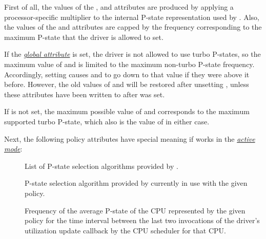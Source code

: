 \documentclass[a4paper,8pt,english]{sphinxmanual}
\begin{document}
First of all, the values of the ,  and
 attributes are produced by applying a processor-specific
multiplier to the internal P-state representation used by .
Also, the values of the  and 
attributes are capped by the frequency corresponding to the maximum P-state that
the driver is allowed to set.

If the  {\hyperref[admin\string-guide/pm/intel_pstate:no\string-turbo\string-attr]{\emph{global attribute}}}\label{admin-guide/pm/intel_pstate:no-turbo-attr} is set, the driver is
not allowed to use turbo P-states, so the maximum value of 
and  is limited to the maximum non-turbo P-state frequency.
Accordingly, setting  causes  and
 to go down to that value if they were above it before.
However, the old values of  and  will be
restored after unsetting , unless these attributes have been written
to after  was set.

If  is not set, the maximum possible value of 
and  corresponds to the maximum supported turbo P-state,
which also is the value of  in either case.

Next, the following policy attributes have special meaning if
 works in the {\hyperref[admin\string-guide/pm/intel_pstate:active\string-mode]{\emph{active mode}}}\label{admin-guide/pm/intel_pstate:active-mode}:
\begin{description}
\item[{}] \leavevmode
List of P-state selection algorithms provided by .

\item[{}] \leavevmode
P-state selection algorithm provided by  currently in
use with the given policy.

\item[{}] \leavevmode
Frequency of the average P-state of the CPU represented by the given
policy for the time interval between the last two invocations of the
driver's utilization update callback by the CPU scheduler for that CPU.

\end{description}
\end{document}
